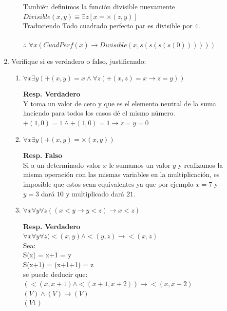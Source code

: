 \documentclass{article}
\begin{document}
\begin{enumerate}
\begin{enumerate}
\begin{enumerate}
\begin{displayquote}
    		            También definimos la función divisible nuevamente\\
    		            $Divisible(x,y) \equiv  \exists z [x = \times(z,y)]$\\
    		            
    		            Traduciendo Todo cuadrado perfecto par es divisible por 4.\\
    		            \\ $\therefore$
    		            $\forall x(CuadPerf(x) \rightarrow Divisible(x,s(s(s(s(0))))))$\\
		                
		            \end{displayquote}
		            
		    \end{enumerate}
		    \item Verifique si es verdadero o falso, justificando:
		    \begin{enumerate}
		        \item $\forall x \exists y(+(x, y) = x \land \forall z(+(x, z) = x \to z = y))$ 
		        \begin{displayquote}
		            \textbf{Resp. Verdadero}
    		        \\Y toma un valor de cero y que es el elemento neutral de la suma haciendo para todos los casos dé el mismo número.
    		        \\
    		        $+(1,0) = 1 \land +(1,0) = 1 \to z=y=0$
		        \end{displayquote}
		        
		        \item $\forall x \exists y(+(x, y) = \times(x, y))$
		        \begin{displayquote}
    		        \textbf{Resp. Falso}
    		        \\Si a un determinado valor $x$ le sumamos un valor $y$ y realizamos la misma operación con las mismas variables en la multiplicación, es imposible que estos sean equivalentes ya que por ejemplo $x=7$ y $y=3$ dará $10$ y multiplicado dará $21$.
		        \end{displayquote}
		        
		        \item $\forall x\forall y\forall z((x < y \to y < z) \to x < z)$
		        \begin{displayquote}
    		        \textbf{Resp. Verdadero}
    		        \\$\forall x\forall y\forall z(<(x,y) \land < (y,z) \to <(x,z)$
    		        \\Sea:
    		        \\S(x) = x+1 = y
    		        \\S(x+1) = (x+1+1) = z
    		        \\se puede deducir que:
    		        \\$(<(x,x+1) \land < (x+1,x+2)) \to <(x,x+2)$
    		        \\$(V) \land (V) \to (V)$
    		        \\$(V1)$
		        \end{displayquote}
		        

\end{enumerate}
\end{enumerate}
\end{enumerate}
\end{document}
